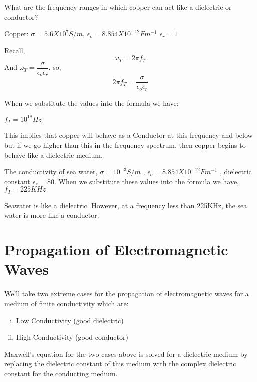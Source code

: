 \begin{exmp}
What are the frequency ranges in which copper can act like a dielectric or conductor?

Copper: $\sigma = 5.6 X 10^{7}S/m$, 
$\epsilon_{o} = 8.854 X 10^{-12}Fm^{-1}$ $\epsilon_{r} = 1$

Recall,
\begin{equation}
\omega_{T} = 2\pi f_{T}
\end{equation}
And $ \omega_{T} = \dfrac{\sigma}{\epsilon_{o}\epsilon_{r}}$, so,
\begin{equation}
2\pi f_{T} = \dfrac{\sigma}{\epsilon_{o}\epsilon_{r}}
\end{equation}

When we substitute the values into the formula we have:

$f_{T} = 10^{18}Hz$

This implies that copper will behave as a Conductor at this frequency and below but if we go higher than this in the frequency spectrum, then copper begins to behave like a dielectric medium.
\end{exmp}

\begin{exmp}
The conductivity of sea water, $\sigma = 10^{-3}S/m$ , $\epsilon_{o} = 8.854 X 10^{-12}Fm^{-1}$ , dielectric constant $\epsilon_{r} = 80$.
When we substitute these values into the formula we have, $f_T=225KHz$

Seawater is like a dielectric. However, at a frequency less than 225KHz, the sea water is more like a conductor.
\end{exmp}

\section{Propagation of Electromagnetic Waves}
We'll take two extreme cases for the propagation of electromagnetic waves for a medium of finite conductivity which are:
\begin{enumerate}[(i)]
\item Low Conductivity (good dielectric)
\item High Conductivity (good conductor)
\end{enumerate}
Maxwell's equation for the two cases above is solved for a dielectric medium by replacing the dielectric constant of this medium with the complex dielectric constant for the conducting medium. 

